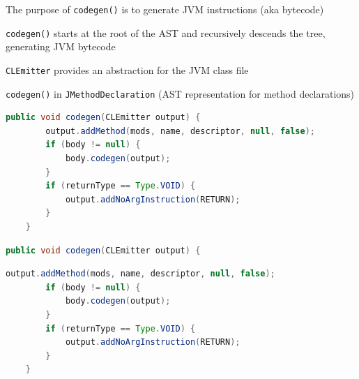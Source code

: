 \documentclass[8pt,a4paper,compress]{beamer}
\begin{document}
\begin{frame}[fragile]
\pause

The purpose of \lstinline{codegen()} is to generate JVM instructions (aka bytecode)

\pause\bigskip

\lstinline{codegen()} starts at the root of the AST and recursively descends the tree, generating JVM bytecode

\pause\bigskip

\lstinline{CLEmitter} provides an abstraction for the JVM class file

\pause\bigskip

\lstinline{codegen()} in \lstinline{JMethodDeclaration} (AST representation for method declarations)

\begin{overprint}
\begin{tcolorbox}[enhanced,drop shadow southwest,sharp corners,size=fbox,colback=white,fontlower=\small\ttfamily,collower=silver100]

\begin{lstlisting}[language=Java,style=focusin]
    public void codegen(CLEmitter output) {
        output.addMethod(mods, name, descriptor, null, false);
        if (body != null) {
            body.codegen(output);
        }
        if (returnType == Type.VOID) {
            output.addNoArgInstruction(RETURN);
        }
    }
\end{lstlisting}

\tcblower
\begin{minipage}[t][.2cm][t]{\textwidth}

\end{minipage}
\end{tcolorbox}

\begin{tcolorbox}[enhanced,drop shadow southwest,sharp corners,size=fbox,colback=white,fontlower=\small\ttfamily,collower=silver900]

\begin{lstlisting}[language=Java,style=focusin,backgroundcolor=\color{lime100}]
    public void codegen(CLEmitter output) {
\end{lstlisting}
\begin{lstlisting}[language=Java,style=focusout]
        output.addMethod(mods, name, descriptor, null, false);
        if (body != null) {
            body.codegen(output);
        }
        if (returnType == Type.VOID) {
            output.addNoArgInstruction(RETURN);
        }
    }
\end{lstlisting}


\end{tcolorbox}
\end{overprint}
\end{frame}
\end{document}
